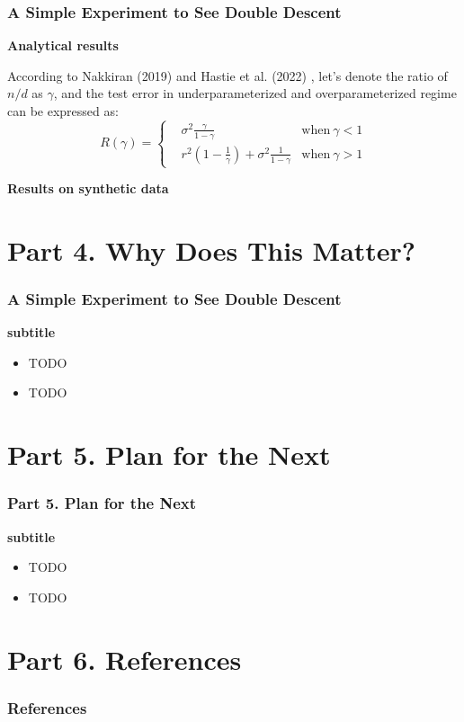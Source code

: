 \documentclass{beamer}
\begin{document}
	\begin{frame}[t]
		\frametitle{A Simple Experiment to See Double Descent}
		\scriptsize
		\textbf{\small Analytical results}
		
		\vspace{1mm}
		According to Nakkiran (2019) \cite{nakkiran2019more} and Hastie et al. (2022) \cite{hastie2022surprises}, let's denote the ratio of $n/d$ as $\gamma$, and the test error in underparameterized and overparameterized regime can be expressed as:
		\begin{equation}
			R(\gamma) = \left\{
			\begin{aligned}
				& \sigma^2\frac{\gamma}{1-\gamma} & \text{when} \ \gamma < 1\\
				& r^2(1-\frac{1}{\gamma}) + \sigma^2\frac{1}{1-\gamma} & \text{when} \ \gamma > 1
			\end{aligned}
			\right.
			\label{eq:5}
		\end{equation}
		
		\textbf{\small Results on synthetic data}
		
	\end{frame}

	\section{Part 4. Why Does This Matter?}
	\begin{frame}[t]
		\frametitle{A Simple Experiment to See Double Descent}
		\scriptsize
		\textbf{\small subtitle}
		\begin{itemize}
			\justifying
			\item TODO
			\item TODO
		\end{itemize}
	\end{frame}
	
	\section{Part 5. Plan for the Next}
	\begin{frame}[t]
		\frametitle{Part 5. Plan for the Next}
		\scriptsize
		\textbf{\small subtitle}
		\begin{itemize}
			\justifying
			\item TODO
			\item TODO
		\end{itemize}
	\end{frame}
	
	\section{Part 6. References}
	\begin{frame}[t]
		\frametitle{References}
		\tiny
		
		
		
	\end{frame}
		
	
\end{document}
